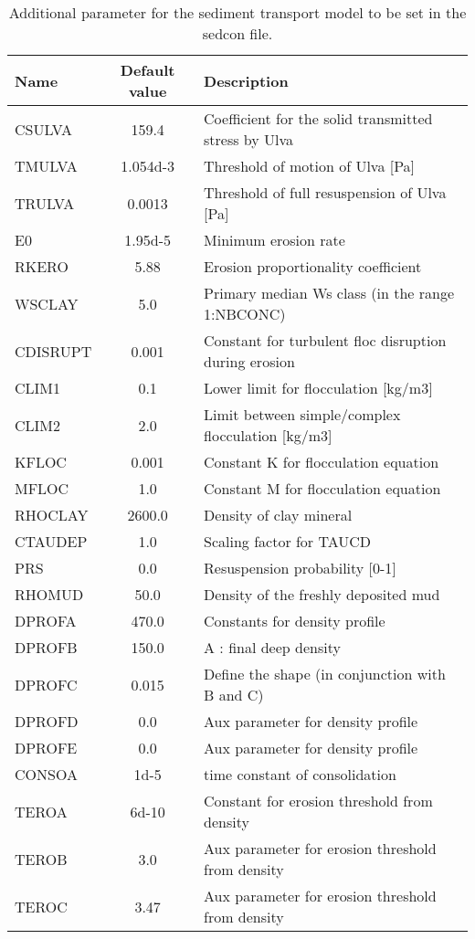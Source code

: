 \begin{table}[ht]
\caption{Additional parameter for the sediment transport model to be set 
in the sedcon file.}
\begin{tabular}{lcl} \hline
Name & Default value & Description \\ \hline
CSULVA  & 159.4 & Coefficient for the solid transmitted stress by Ulva \\
TMULVA  & 1.054d-3 & Threshold of motion of Ulva [Pa] \\
TRULVA  & 0.0013 & Threshold of full resuspension of Ulva [Pa] \\
E0      & 1.95d-5 & Minimum erosion rate \\
RKERO   & 5.88 & Erosion proportionality coefficient \\
WSCLAY  & 5.0 & Primary median Ws class (in the range 1:NBCONC) \\
CDISRUPT& 0.001 & Constant for turbulent floc disruption during erosion \\
CLIM1   & 0.1 & Lower limit for flocculation [kg/m3] \\
CLIM2   & 2.0 & Limit between simple/complex flocculation [kg/m3] \\
KFLOC   & 0.001 & Constant K for flocculation equation \\
MFLOC   & 1.0 & Constant M for flocculation equation \\
RHOCLAY & 2600.0 &  Density of clay mineral \\
CTAUDEP & 1.0 & Scaling factor for TAUCD \\
PRS     & 0.0 & Resuspension probability [0-1] \\
RHOMUD  & 50.0 & Density of the freshly deposited mud \\
DPROFA  & 470.0 & Constants for density profile \\
DPROFB  & 150.0 & A : final deep density \\
DPROFC  & 0.015 & Define the shape (in conjunction with B and C) \\
DPROFD  & 0.0 & Aux parameter for density profile \\
DPROFE  & 0.0 & Aux parameter for density profile \\
CONSOA  & 1d-5 & time constant of consolidation \\
TEROA   & 6d-10 & Constant for erosion threshold from density \\
TEROB   & 3.0 & Aux parameter for erosion threshold from density \\
TEROC   & 3.47 & Aux parameter for erosion threshold from density \\

\end{tabular}
\end{table}

